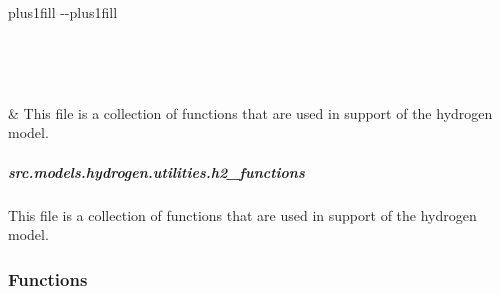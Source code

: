 \documentclass[letterpaper,10pt,english]{sphinxmanual}
\begin{document}
\begin{savenotes}
\sphinxatlongtablestart
\sphinxthistablewithglobalstyle
\sphinxthistablewithnovlinesstyle
\makeatletter
  \LTleft \@totalleftmargin plus1fill
  \LTright\dimexpr\columnwidth-\@totalleftmargin-\linewidth\relax plus1fill
\makeatother
\begin{longtable}{}
\sphinxtoprule
\endfirsthead

\\
\sphinxtoprule
\endhead

\sphinxbottomrule
{}\\
\endfoot

\endlastfoot
\sphinxtableatstartofbodyhook

\sphinxAtStartPar
{\hyperref[\detokenize{src.models.hydrogen.utilities.h2_functions:module-src.models.hydrogen.utilities.h2_functions}]{}}
&
\sphinxAtStartPar
This file is a collection of functions that are used in support of the hydrogen model.
\\
\sphinxbottomrule
\end{longtable}
\sphinxtableafterendhook
\sphinxatlongtableend
\end{savenotes}

\sphinxstepscope


\subparagraph{src.models.hydrogen.utilities.h2\_functions}
\label{\detokenize{src.models.hydrogen.utilities.h2_functions:module-src.models.hydrogen.utilities.h2_functions}}\label{\detokenize{src.models.hydrogen.utilities.h2_functions:src-models-hydrogen-utilities-h2-functions}}\label{\detokenize{src.models.hydrogen.utilities.h2_functions::doc}}
\sphinxAtStartPar
This file is a collection of functions that are used in support of the hydrogen model.
\subsubsection*{Functions}
\end{document}
